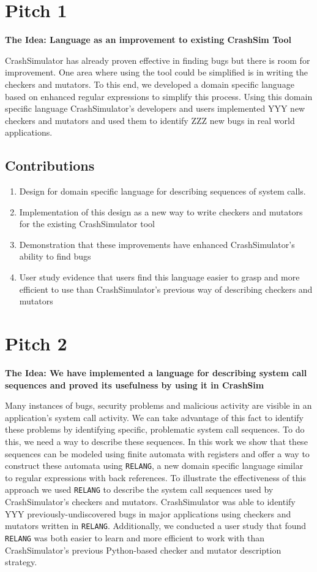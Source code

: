 \documentclass{article}
\begin{document}
\section{Pitch 1}
\textbf{The Idea:  Language as an improvement to existing CrashSim
Tool}\break

CrashSimulator has already proven effective in finding bugs but there is
room for improvement.   One area where using the tool could be simplified is in
writing the checkers and mutators.  To this end, we developed a domain specific
language based on enhanced regular expressions to simplify this process.
Using this domain specific language CrashSimulator’s developers and users
implemented YYY new checkers and mutators and used them to identify ZZZ new bugs
in real world applications.

\subsection{Contributions}
\begin{enumerate}
\item{Design for domain specific language for describing sequences of
    system calls.}
\item{Implementation of this design as a new way to write checkers and mutators for
    the existing CrashSimulator tool}
\item{Demonstration that these improvements have enhanced CrashSimulator’s ability
    to find bugs}
\item{User study evidence that users find this language easier to grasp and more efficient to
    use than CrashSimulator’s previous way of describing checkers and mutators}
\end{enumerate}

\section{Pitch 2}
\textbf{The Idea: We have implemented a language for describing system
call sequences and proved its usefulness by using it in CrashSim}\break

Many instances of bugs, security problems and malicious activity are
visible in an application's system call activity.  We can take advantage of
this fact to identify these problems by identifying specific,
problematic system call sequences.  To do this, we need a way to describe
these sequences.  In this work we show that these sequences can be modeled
using finite automata with registers and offer a way to construct these
automata using {\tt RELANG}, a new domain specific
language similar to regular expressions with back
references.  To illustrate the effectiveness of this approach we
used {\tt RELANG} to describe the system call sequences used by
CrashSimulator's checkers and mutators.  CrashSimulator was able to
identify YYY previously-undiscovered bugs in major applications using
checkers and mutators written in {\tt RELANG}.  Additionally, we conducted a
user study that found {\tt RELANG} was both easier to learn and more
efficient to work with than CrashSimulator's previous Python-based checker
and mutator description strategy.
\end{document}

